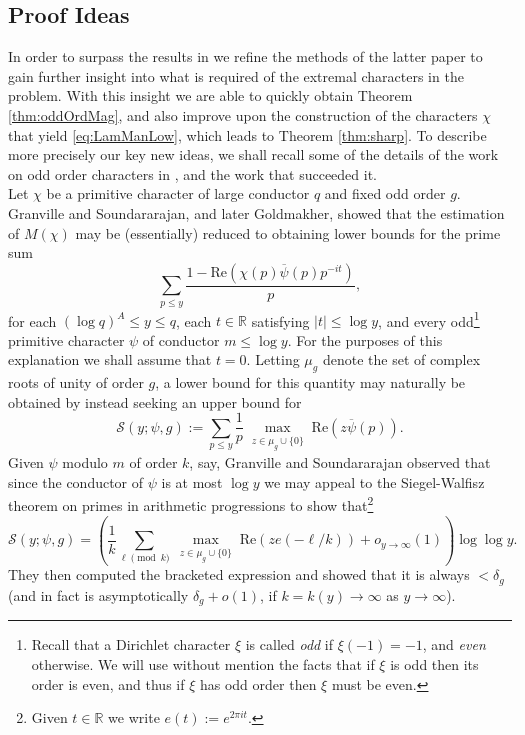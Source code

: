 \documentclass[10pt]{amsart}
\theoremstyle{definition}
\newcommand{\ra}{\rightarrow}
\newcommand{\mc}{\mathcal}
\newcommand{\mb}{\mathbb}
\renewcommand{\ss}{\substack}
\renewcommand{\bar}{\overline}
\begin{document}
\subsection{Proof Ideas}
In order to surpass the results in \cite{LamMan} we refine the methods of the latter paper to gain further insight into what is required of the extremal characters in the problem. With this insight we are able to quickly obtain Theorem \ref{thm:oddOrdMag}, and also improve upon the construction of the characters $\chi$ that yield \eqref{eq:LamManLow}, which leads to Theorem \ref{thm:sharp}. To describe more precisely our key new ideas, we shall recall some of the details of the work on odd order characters in \cite{GSPret}, and the work that succeeded it. \\
Let $\chi$ be a primitive character of large conductor $q$ and fixed odd order $g$. Granville and Soundararajan, and later Goldmakher, showed that the estimation of $M(\chi)$ may be (essentially) reduced to obtaining lower bounds for the prime sum
$$
\sum_{p \leq y} \frac{1-\text{Re}(\chi(p)\bar{\psi}(p)p^{-it})}{p},
$$
for each $(\log q)^A \leq y \leq q$, each $t \in \mb{R}$ satisfying $|t| \leq \log y$, and every odd\footnote{Recall that a Dirichlet character $\xi$ is called \emph{odd} if $\xi(-1) = -1$, and \emph{even} otherwise. We will use without mention the facts that if $\xi$ is odd then its order is even, and thus if $\xi$ has odd order then $\xi$ must be even.} primitive character $\psi$ of conductor $m \leq \log y$. For the purposes of this explanation we shall assume that $t = 0$. Letting $\mu_g$ denote the set of complex roots of unity of order $g$, a lower bound for this quantity may naturally be obtained by instead seeking an upper bound for
\begin{equation}\label{eq:maxCorrel}
\mc{S}(y;\psi,g) := \sum_{p \leq y} \frac{1}{p}\max_{\ss{z \in \mu_g \cup \{0\}}} \text{Re}(z \bar{\psi}(p)).
\end{equation}
Given $\psi$ modulo $m$ of order $k$, say, Granville and Soundararajan observed that since the conductor of $\psi$ is at most $\log y$ we may appeal to the Siegel-Walfisz theorem on primes in arithmetic progressions to show that\footnote{Given $t \in \mb{R}$ we write $e(t) := e^{2\pi it}$.}
$$
\mc{S}(y; \psi,g) = \left(\frac{1}{k} \sum_{\ell \pmod{k}} \max_{\ss{z \in \mu_g \cup \{0\}}} \text{Re}(z e(-\ell/k)) + o_{y \ra \infty}(1)\right) \log\log y.
$$
They then computed the bracketed expression and showed that it is always $< \delta_g$ (and in fact is asymptotically $\delta_g + o(1)$, if $k = k(y) \ra \infty$ as $y \ra \infty$). \\
\end{document}

